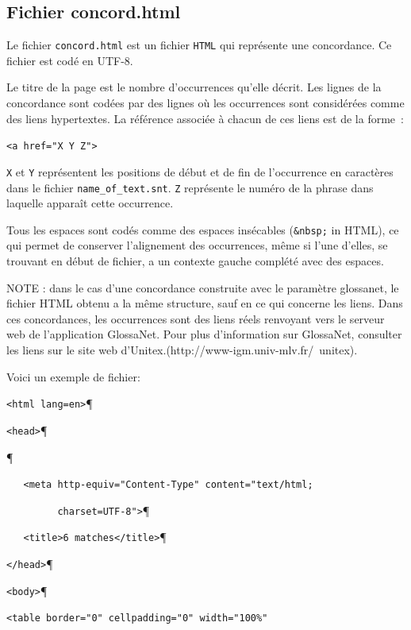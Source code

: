 \subsection{Fichier concord.html}
Le fichier \verb+concord.html+ est un fichier \verb+HTML+ qui représente une concordance. Ce fichier
est codé en UTF-8.

\bigskip
\noindent Le titre de la page est le nombre d’occurrences qu’elle décrit. Les lignes de la
concordance sont codées par des lignes où les occurrences sont considérées comme des liens
hypertextes. La référence associée à chacun de ces liens est de la forme~:

\medskip
\verb+<a href="X Y Z">+

\medskip
\noindent \verb+X+ et \verb+Y+ représentent les positions de début et de fin de l’occurrence en caractères
dans le fichier \verb+name_of_text.snt+. \verb+Z+ représente le numéro de la phrase dans laquelle
apparaît cette occurrence.

\bigskip
\noindent Tous les espaces sont codés comme des espaces insécables (\verb+&nbsp;+ in HTML), ce qui
permet de conserver l’alignement des occurrences, même si l’une d’elles, se trouvant en début de
fichier, a un contexte gauche complété avec des espaces.


\bigskip
\noindent NOTE : dans le cas d’une concordance construite avec le paramètre glossanet, le fichier
HTML obtenu a la même structure, sauf en ce qui concerne les liens. Dans ces concordances, les
occurrences sont des liens réels renvoyant vers le serveur web de l’application GlossaNet. Pour plus
d’information sur GlossaNet, consulter les liens sur le site web
d’Unitex.(http://www-igm.univ-mlv.fr/~unitex).

\bigskip
\noindent Voici un exemple de fichier:

\bigskip

\verb$<html lang=en>$\P

\verb$<head>$\P

\verb$$\P

\verb$   <meta http-equiv="Content-Type" content="text/html;$

\verb$         charset=UTF-8">$\P

\verb$   <title>6 matches</title>$\P

\verb$</head>$\P

\verb$<body>$\P

\verb$<table border="0" cellpadding="0" width="100%" $

